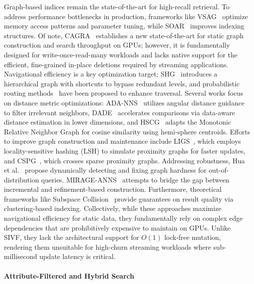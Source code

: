 \documentclass[sigconf,nonacm]{acmart}
\theoremstyle{plain}
\theoremstyle{definition}
\theoremstyle{remark}
\begin{document}
Graph-based indices remain the state-of-the-art for high-recall retrieval. To address performance bottlenecks in production, frameworks like VSAG~\cite{10.14778/3750601.3750624} optimize memory access patterns and parameter tuning, while SOAR~\cite{DBLP:conf/nips/SunSDGK23} improves indexing structures. 
Of note, CAGRA~\cite{10597683} establishes a new state-of-the-art for static graph construction and search throughput on GPUs; however, it is fundamentally designed for write-once-read-many workloads and lacks native support for the efficient, fine-grained in-place deletions required by streaming applications.
Navigational efficiency is a key optimization target; SHG~\cite{10.14778/3748191.3748212} introduces a hierarchical graph with shortcuts to bypass redundant levels, and probabilistic routing methods~\cite{lu2024probabilistic} have been proposed to enhance traversal. 
Several works focus on distance metric optimizations: ADA-NNS~\cite{10.1145/3696410.3714870} utilizes angular distance guidance to filter irrelevant neighbors, DADE~\cite{10.14778/3712221.3712244} accelerates comparisons via data-aware distance estimation in lower dimensions, and HSCG~\cite{10.1145/3769786} adapts the Monotonic Relative Neighbor Graph for cosine similarity using hemi-sphere centroids.
Efforts to improve graph construction and maintenance include LIGS~\cite{10.1145/3726302.3730028}, which employs locality-sensitive hashing (LSH) to simulate proximity graphs for faster updates, and CSPG~\cite{DBLP:conf/nips/YangCZ24}, which crosses sparse proximity graphs. 
Addressing robustness, Hua et al.~\cite{10.1145/3769783} propose dynamically detecting and fixing graph hardness for out-of-distribution queries. MIRAGE-ANNS~\cite{10.1145/3725325} attempts to bridge the gap between incremental and refinement-based construction. 
Furthermore, theoretical frameworks like Subspace Collision~\cite{10.1145/3709729} provide guarantees on result quality via clustering-based indexing.
Collectively, while these approaches maximize navigational efficiency for static data, they fundamentally rely on complex edge dependencies that are prohibitively expensive to maintain on GPUs. Unlike SIVF, they lack the architectural support for $O(1)$ lock-free mutation, rendering them unsuitable for high-churn streaming workloads where sub-millisecond update latency is critical.

\paragraph{Attribute-Filtered and Hybrid Search}
\end{document}
